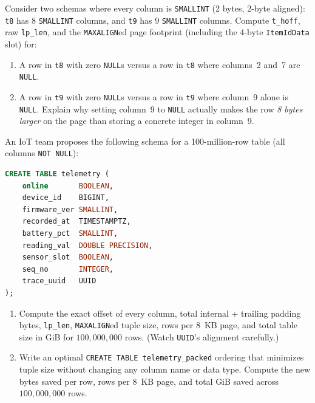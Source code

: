 \begin{exercise}
\label{ex:ch02-null-cliff}
Consider two schemas where every column is \texttt{SMALLINT} (2 bytes, 2-byte aligned): \texttt{t8} has 8 \texttt{SMALLINT} columns, and \texttt{t9} has 9 \texttt{SMALLINT} columns. Compute \texttt{t\_hoff}, raw \texttt{lp\_len}, and the \texttt{MAXALIGN}ed page footprint (including the 4-byte \texttt{ItemIdData} slot) for:
\begin{enumerate}[label=(\alph*)]
  \item A row in \texttt{t8} with zero \texttt{NULL}s versus a row in \texttt{t8} where columns~2 and~7 are \texttt{NULL}.
  \item A row in \texttt{t9} with zero \texttt{NULL}s versus a row in \texttt{t9} where column~9 alone is \texttt{NULL}. Explain why setting column~9 to \texttt{NULL} actually makes the row \emph{8 bytes larger} on the page than storing a concrete integer in column~9.
\end{enumerate}
\end{exercise}

\begin{exercise}
\label{ex:ch02-tetris-calc}
An IoT team proposes the following schema for a 100-million-row table (all columns \texttt{NOT NULL}):
\begin{lstlisting}[language=SQL]
CREATE TABLE telemetry (
    online       BOOLEAN,
    device_id    BIGINT,
    firmware_ver SMALLINT,
    recorded_at  TIMESTAMPTZ,
    battery_pct  SMALLINT,
    reading_val  DOUBLE PRECISION,
    sensor_slot  BOOLEAN,
    seq_no       INTEGER,
    trace_uuid   UUID
);
\end{lstlisting}
\begin{enumerate}[label=(\alph*)]
  \item Compute the exact offset of every column, total internal + trailing padding bytes, \texttt{lp\_len}, \texttt{MAXALIGN}ed tuple size, rows per 8~KB page, and total table size in GiB for $100{,}000{,}000$ rows. (Watch \texttt{UUID}'s alignment carefully.)
  \item Write an optimal \texttt{CREATE TABLE telemetry\_packed} ordering that minimizes tuple size without changing any column name or data type. Compute the new bytes saved per row, rows per 8~KB page, and total GiB saved across $100{,}000{,}000$ rows.
\end{enumerate}
\end{exercise}

